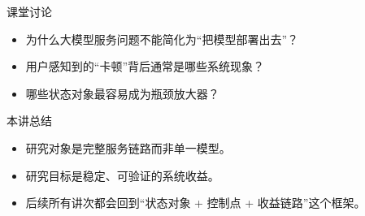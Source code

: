 

\begin{frame}{课堂讨论}
  \begin{itemize}
    \item 为什么大模型服务问题不能简化为“把模型部署出去”？
    \item 用户感知到的“卡顿”背后通常是哪些系统现象？
    \item 哪些状态对象最容易成为瓶颈放大器？
  \end{itemize}
\end{frame}

\begin{frame}{本讲总结}
  \begin{itemize}
    \item 研究对象是完整服务链路而非单一模型。
    \item 研究目标是稳定、可验证的系统收益。
    \item 后续所有讲次都会回到“状态对象 + 控制点 + 收益链路”这个框架。
  \end{itemize}
\end{frame}

